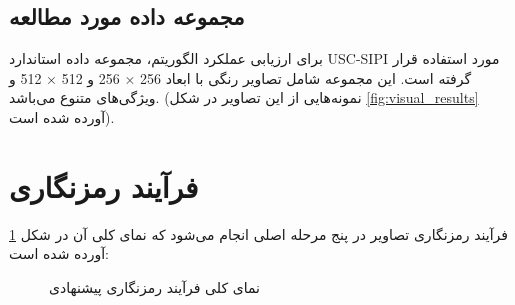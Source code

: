 \documentclass[a4paper,12pt]{report}
\renewcommand{\%}{\lr{\oldpercent}}
\providecommand{\lr}[1]{#1}
\begin{document}
\subsection{مجموعه داده مورد مطالعه}
برای ارزیابی عملکرد الگوریتم، مجموعه داده استاندارد \lr{USC-SIPI} مورد استفاده قرار گرفته است. این مجموعه شامل تصاویر رنگی با ابعاد 256 × 256 و 512 × 512 و ویژگی‌های متنوع می‌باشد. (نمونه‌هایی از این تصاویر در شکل \ref{fig:visual_results} آورده شده است).
\section{فرآیند رمزنگاری}
فرآیند رمزنگاری تصاویر در پنج مرحله اصلی انجام می‌شود که نمای کلی آن در شکل \ref{fig:encryption_pipeline} آورده شده است:

\begin{figure}[h!]
\centering
\begin{latin}
\small
{}
\end{latin}
\caption{نمای کلی فرآیند رمزنگاری پیشنهادی} \label{fig:encryption_pipeline}
\end{figure}
\end{document}

